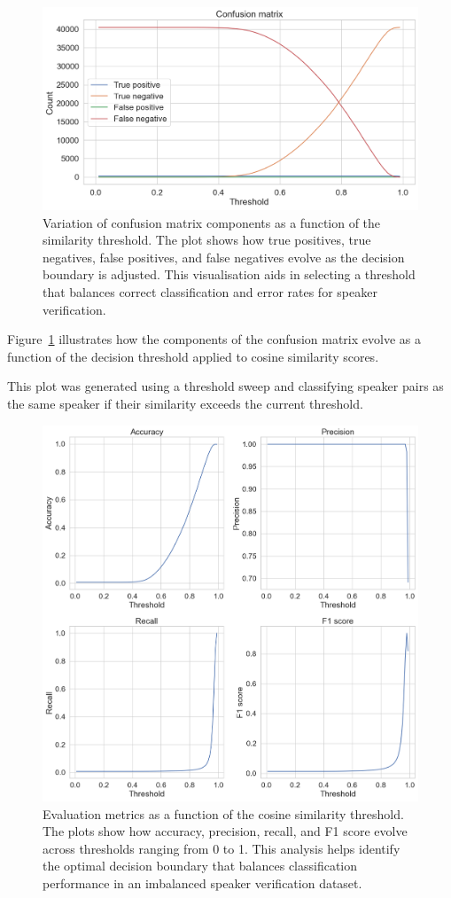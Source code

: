 \documentclass[conference]{IEEEtran}
\begin{document}
	
	\begin{figure}[H]
		\centering
		\includegraphics[width=0.7\linewidth]{img/img-confusion-matrix}
		\caption{Variation of confusion matrix components as a function of the similarity threshold. The plot shows how true positives, true negatives, false positives, and false negatives evolve as the decision boundary is adjusted. This visualisation aids in selecting a threshold that balances correct classification and error rates for speaker verification.}
		\label{fig:img-confusion-matrix}
	\end{figure}
	
	
	Figure~\ref{fig:img-confusion-matrix} illustrates how the components of the confusion matrix evolve as a function of the decision threshold applied to cosine similarity scores.
	
	This plot was generated using a threshold sweep and classifying speaker pairs as the same speaker if their similarity exceeds the current threshold.
	
	\begin{figure}[H]
		\centering
		\includegraphics[width=0.9\linewidth]{img/img-metrics}
		\caption{Evaluation metrics as a function of the cosine similarity threshold. The plots show how accuracy, precision, recall, and F1 score evolve across thresholds ranging from 0 to 1. This analysis helps identify the optimal decision boundary that balances classification performance in an imbalanced speaker verification dataset.}
		\label{fig:img-metrics}
	\end{figure}
	
\end{document}
